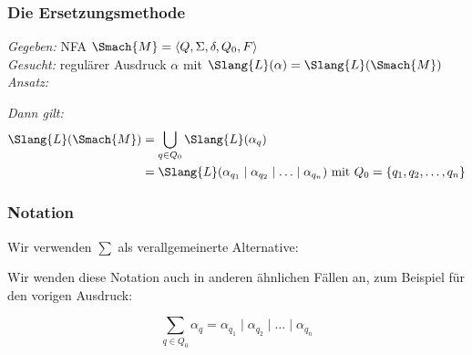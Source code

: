 \documentclass[aspectratio=1610,onlymath]{beamer}
\begin{document}
\begin{frame}\frametitle{Die Ersetzungsmethode}

\emph{Gegeben:} NFA  $\Smach{M}=\tuple{Q,\Sigma,\delta,Q_0,F}$\\[1ex]
\emph{Gesucht:} regulärer Ausdruck $\alpha$ mit $\Slang{L}(\alpha)=\Slang{L}(\Smach{M})$\\[1ex]

\emph{Ansatz:}


\emph{Dann gilt:}
\begin{align*}
\Slang{L}(\Smach{M}) &=\bigcup_{q\in Q_0} \Slang{L}(\alpha_q) \\
	&=  \Slang{L}(\alpha_{q_1}\mid\alpha_{q_2}\mid\ldots\mid \alpha_{q_n})\text{ mit }Q_0=\{q_1,q_2,\ldots,q_n\}
\end{align*}

\end{frame}

\begin{frame}\frametitle{Notation}

Wir verwenden $\sum$ als verallgemeinerte Alternative:\medskip

\bigskip

Wir wenden diese Notation auch in anderen ähnlichen Fällen an, zum Beispiel für den vorigen Ausdruck:

\[\sum_{q\in Q_0} \alpha_q = \alpha_{q_1}\mid\alpha_{q_2}\mid\ldots\mid \alpha_{q_n}\]

\end{frame}
\end{document}
